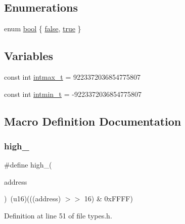 \subsection*{Enumerations}
\begin{DoxyCompactItemize}
\item 
enum \hyperlink{a00038_af6a258d8f3ee5206d682d799316314b1_af6a258d8f3ee5206d682d799316314b1}{bool} \{ \hyperlink{a00038_af6a258d8f3ee5206d682d799316314b1_af6a258d8f3ee5206d682d799316314b1ae9de385ef6fe9bf3360d1038396b884c}{false}, 
\hyperlink{a00038_af6a258d8f3ee5206d682d799316314b1_af6a258d8f3ee5206d682d799316314b1a08f175a5505a10b9ed657defeb050e4b}{true}
 \}
\end{DoxyCompactItemize}
\subsection*{Variables}
\begin{DoxyCompactItemize}
\item 
const int \hyperlink{a00038_a22a331617ae96c4a5ccf0b9c551f4a38_a22a331617ae96c4a5ccf0b9c551f4a38}{intmax\+\_\+t} = 9223372036854775807
\item 
const int \hyperlink{a00038_a345eb85d099c85b858e47ea4ca7410f8_a345eb85d099c85b858e47ea4ca7410f8}{intmin\+\_\+t} = -\/9223372036854775807
\end{DoxyCompactItemize}


\subsection{Macro Definition Documentation}
\mbox{\label{a00038_a0a63db19c3e2153ed419aeccf4e33c92_a0a63db19c3e2153ed419aeccf4e33c92}} 
\subsubsection{\texorpdfstring{high\+\_}{high\_16}}
{\footnotesize\ttfamily \#define high\+\_(\begin{DoxyParamCaption}\item[{}]{address }\end{DoxyParamCaption})~(u16)(((address) $>$$>$ 16) \& 0x\+F\+F\+F\+F)}



Definition at line 51 of file types.\+h.


